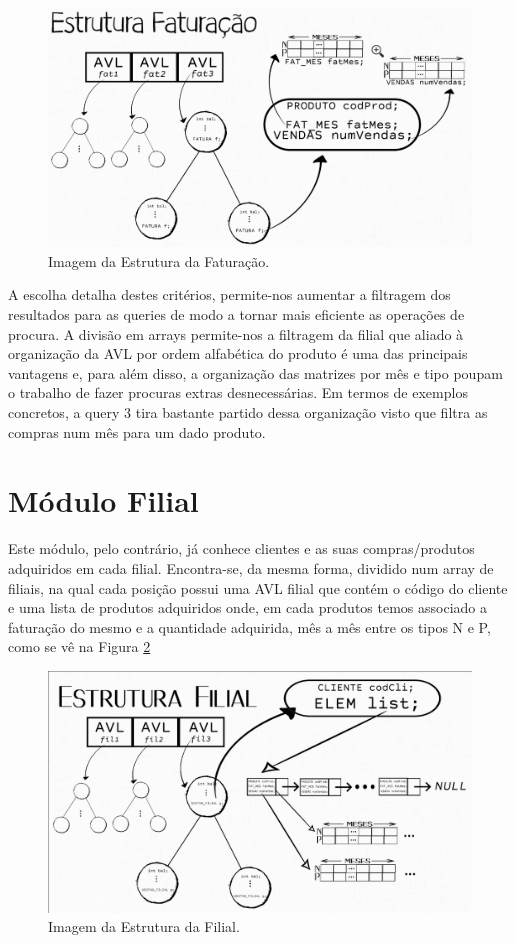 \documentclass[a4paper,11pt]{report}
\begin{document}
\begin{figure}[h!]
  \centering
  \includegraphics[scale=0.20]{Faturacao.png}
  \caption{Imagem da Estrutura da Faturação.}
  \label{fig3}
\end{figure}

A escolha detalha destes critérios, permite-nos aumentar a filtragem dos resultados para as queries de modo a tornar mais eficiente as operações de procura. A divisão em arrays permite-nos a filtragem da filial que aliado à organização da AVL por ordem alfabética do produto é uma das principais vantagens e, para além disso, a organização das matrizes por mês e tipo poupam o trabalho de fazer procuras extras desnecessárias. Em termos de exemplos concretos, a query 3 tira bastante partido dessa organização visto que filtra as compras num mês para um dado produto.


\section{Módulo Filial}
Este módulo, pelo contrário, já conhece clientes e as suas compras/produtos adquiridos em cada filial. Encontra-se, da mesma forma, dividido num array de filiais, na qual cada posição possui uma AVL filial que contém o código do cliente e uma lista de produtos adquiridos onde, em cada produtos temos associado a faturação do mesmo e a quantidade adquirida, mês a mês entre os tipos N e P, como se vê na Figura \ref{fig4}

\begin{figure}[h!]
  \centering
  \includegraphics[scale=0.20]{Filial.png}
  \caption{Imagem da Estrutura da Filial.}
  \label{fig4}
\end{figure}
\end{document}

